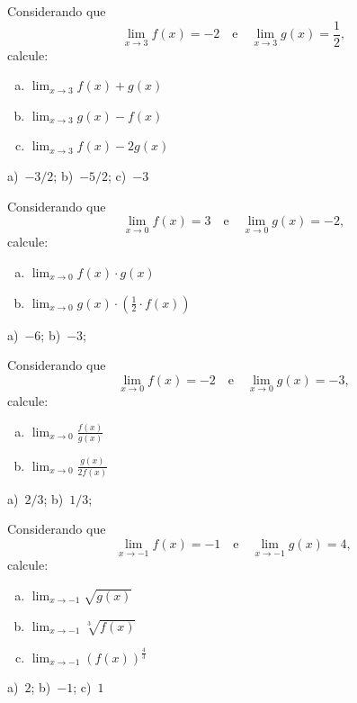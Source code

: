 \begin{exer}
  Considerando que
  \begin{equation}
    \lim_{x\to 3} f(x) = -2\quad\text{e}\quad\lim_{x\to 3} g(x) = \frac{1}{2},
  \end{equation}
  calcule:
  \begin{enumerate}[a)]
  \item $\displaystyle\lim_{x\to 3} f(x)+g(x)$
  \item $\displaystyle\lim_{x\to 3} g(x)-f(x)$
  \item $\displaystyle\lim_{x\to 3} f(x)-2g(x)$
  \end{enumerate}
\end{exer}
\begin{resp}
  a)~$-3/2$; b)~$-5/2$; c)~$-3$
\end{resp}

\begin{exer}
  Considerando que
  \begin{equation}
    \lim_{x\to 0} f(x) = 3\quad\text{e}\quad\lim_{x\to 0} g(x) = -2,
  \end{equation}
  calcule:
  \begin{enumerate}[a)]
  \item $\displaystyle\lim_{x\to 0} f(x)\cdot g(x)$
  \item $\displaystyle\lim_{x\to 0} g(x)\cdot (\frac{1}{2}\cdot f(x))$
  \end{enumerate}
\end{exer}
\begin{resp}
  a)~$-6$; b)~$-3$;
\end{resp}

\begin{exer}
  Considerando que
  \begin{equation}
    \lim_{x\to 0} f(x) = -2\quad\text{e}\quad\lim_{x\to 0} g(x) = -3,
  \end{equation}
  calcule:
  \begin{enumerate}[a)]
  \item $\displaystyle\lim_{x\to 0} \frac{f(x)}{g(x)}$
  \item $\displaystyle\lim_{x\to 0} \frac{g(x)}{2f(x)}$
  \end{enumerate}
\end{exer}
\begin{resp}
  a)~$2/3$; b)~$1/3$;
\end{resp}

\begin{exer}
  Considerando que
  \begin{equation}
    \lim_{x\to -1} f(x) = -1\quad\text{e}\quad\lim_{x\to -1} g(x) = 4,
  \end{equation}
  calcule:
  \begin{enumerate}[a)]
  \item $\displaystyle\lim_{x\to -1} \sqrt{g(x)}$
  \item $\displaystyle\lim_{x\to -1} \sqrt[3]{f(x)}$
  \item $\displaystyle\lim_{x\to -1} (f(x))^{\frac{4}{3}}$
  \end{enumerate}
\end{exer}
\begin{resp}
  a)~$2$; b)~$-1$; c)~$1$
\end{resp}

